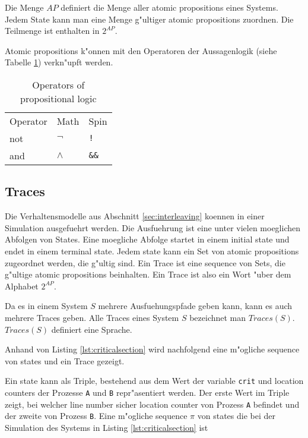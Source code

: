 \documentclass[a4paper, twoside]{article}
\begin{document}
Die Menge $AP$ definiert die Menge aller atomic propositions eines Systems. Jedem State kann man eine Menge g"ultiger atomic propositions zuordnen. Die Teilmenge ist enthalten in $2^{AP}$.
 
Atomic propositions k"onnen mit den Operatoren der Aussagenlogik (siehe Tabelle \ref{tab:operators_of_propositionallogic}) verkn"upft werden.


\begin{table}
  \centering

  \begin{tabular}{l l l}
    Operator & Math & Spin \\
    not & $\neg$ & \verb|!| \\
    and & $\land$ & \verb|&&| \\
  \end{tabular}
  \caption{Operators of propositional logic }
  \label{tab:operators_of_propositionallogic}
\end{table}

\subsection{Traces}
\label{sec:traces}

Die Verhaltensmodelle aus Abschnitt \ref{sec:interleaving} koennen in einer Simulation ausgefuehrt werden. Die Ausfuehrung ist eine unter vielen moeglichen Abfolgen von States. Eine moegliche Abfolge startet in einem initial state und endet in einem terminal state. Jedem state kann ein Set von atomic propositions zugeordnet werden, die g"ultig sind. Ein Trace ist eine sequence von Sets, die g"ultige atomic propositions beinhalten. Ein Trace ist also ein Wort "uber dem Alphabet $2^{AP}$.

Da es in einem System $S$ mehrere Ausfuehungspfade geben kann, kann es auch mehrere Traces geben. Alle Traces eines System $S$ bezeichnet man $Traces(S)$. $Traces(S)$ definiert eine Sprache.

Anhand von Listing \ref{lst:criticalsection} wird nachfolgend eine m"ogliche sequence von states und ein Trace gezeigt.



Ein state kann als Triple, bestehend aus dem Wert der variable \verb|crit| und location counters der Prozesse \verb|A| und \verb|B| repr"asentiert werden. Der erste Wert im Triple zeigt, bei welcher line number sicher location counter von Prozess \verb|A| befindet und der zweite von Prozess \verb|B|.
Eine m"ogliche sequence $\pi$ von states die bei der Simulation des Systems in Listing \ref{lst:criticalsection} ist
\end{document}
